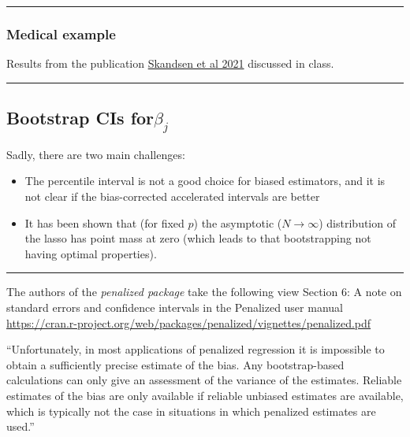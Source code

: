 \documentclass[
  letterpaper,
  DIV=11,
  numbers=noendperiod]{scrartcl}
\providecommand{\tightlist}{%
  \setlength{\itemsep}{0pt}\setlength{\parskip}{0pt}}\usepackage{longtable,booktabs,array}
\begin{document}
\begin{center}\rule{0.5\linewidth}{0.5pt}\end{center}

\hypertarget{medical-example}{%
\subsubsection{Medical example}\label{medical-example}}

Results from the publication
\href{https://www.archives-pmr.org/article/S0003-9993(20)31154-0/fulltext}{Skandsen
et al 2021} discussed in class.

\begin{center}\rule{0.5\linewidth}{0.5pt}\end{center}

\hypertarget{bootstrap-cis-forbeta_j}{%
\subsection{\texorpdfstring{Bootstrap CIs
for\(\beta_j\)}{Bootstrap CIs for\textbackslash beta\_j}}\label{bootstrap-cis-forbeta_j}}

Sadly, there are two main challenges:

\begin{itemize}
\tightlist
\item
  The percentile interval is not a good choice for biased estimators,
  and it is not clear if the bias-corrected accelerated intervals are
  better
\item
  It has been shown that (for fixed \(p\)) the asymptotic
  (\(N\rightarrow \infty\)) distribution of the lasso has point mass at
  zero (which leads to that bootstrapping not having optimal
  properties).
\end{itemize}

\begin{center}\rule{0.5\linewidth}{0.5pt}\end{center}

The authors of the \emph{penalized package} take the following view
Section 6: A note on standard errors and confidence intervals in the
Penalized user manual
\url{https://cran.r-project.org/web/packages/penalized/vignettes/penalized.pdf}

``Unfortunately, in most applications of penalized regression it is
impossible to obtain a suﬃciently precise estimate of the bias. Any
bootstrap-based calculations can only give an assessment of the variance
of the estimates. Reliable estimates of the bias are only available if
reliable unbiased estimates are available, which is typically not the
case in situations in which penalized estimates are used.''
\end{document}
